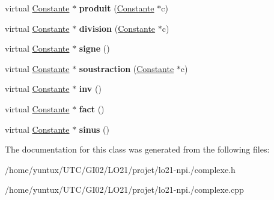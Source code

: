 \begin{DoxyCompactItemize}
\item 
\hypertarget{class_complexe_a921d9d4a3efcf108cb437b265cd65c10}{virtual \hyperlink{class_constante}{\-Constante} $\ast$ {\bfseries produit} (\hyperlink{class_constante}{\-Constante} $\ast$c)}\label{class_complexe_a921d9d4a3efcf108cb437b265cd65c10}

\item 
\hypertarget{class_complexe_a1a2f7b85999d542ebff0a9c0d082c1c8}{virtual \hyperlink{class_constante}{\-Constante} $\ast$ {\bfseries division} (\hyperlink{class_constante}{\-Constante} $\ast$c)}\label{class_complexe_a1a2f7b85999d542ebff0a9c0d082c1c8}

\item 
\hypertarget{class_complexe_a97bb77958c4012ed113c54f895f91e85}{virtual \hyperlink{class_constante}{\-Constante} $\ast$ {\bfseries signe} ()}\label{class_complexe_a97bb77958c4012ed113c54f895f91e85}

\item 
\hypertarget{class_complexe_a07d706446560190792339549752f9ea3}{virtual \hyperlink{class_constante}{\-Constante} $\ast$ {\bfseries soustraction} (\hyperlink{class_constante}{\-Constante} $\ast$c)}\label{class_complexe_a07d706446560190792339549752f9ea3}

\item 
\hypertarget{class_complexe_afb48ef33e0289c8f05a959f83d9ec621}{virtual \hyperlink{class_constante}{\-Constante} $\ast$ {\bfseries inv} ()}\label{class_complexe_afb48ef33e0289c8f05a959f83d9ec621}

\item 
\hypertarget{class_complexe_a0b0532339249783cee39f28670bb7504}{virtual \hyperlink{class_constante}{\-Constante} $\ast$ {\bfseries fact} ()}\label{class_complexe_a0b0532339249783cee39f28670bb7504}

\item 
\hypertarget{class_complexe_ab4fdc60272bd80f1df8f8c1c29c11813}{virtual \hyperlink{class_constante}{\-Constante} $\ast$ {\bfseries sinus} ()}\label{class_complexe_ab4fdc60272bd80f1df8f8c1c29c11813}

\end{DoxyCompactItemize}


\-The documentation for this class was generated from the following files\-:\begin{DoxyCompactItemize}
\item 
/home/yuntux/\-U\-T\-C/\-G\-I02/\-L\-O21/projet/lo21-\/npi./complexe.\-h\item 
/home/yuntux/\-U\-T\-C/\-G\-I02/\-L\-O21/projet/lo21-\/npi./complexe.\-cpp\end{DoxyCompactItemize}
